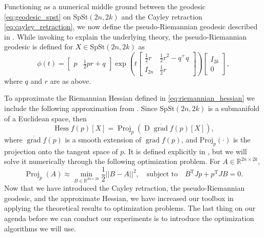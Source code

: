 Functioning as a numerical middle ground between the geodesic \eqref{eq:geodesic_spst} on $\mathrm{SpSt}(2n, 2k)$ and the Cayley retraction \eqref{eq:cayley_retraction}, we now define the pseudo-Riemannian geodesic described in \cite[p.~10]{BendokatZimmermann2021}. While invoking \cite{BendokatZimmermann2021} to explain the underlying theory, the pseudo-Riemannian geodesic is defined for $X\in \mathrm{SpSt}(2n, 2k)$ as 
%
\begin{equation*}
\phi(t)=\begin{bmatrix}
p & \frac{1}{2}pr+q
\end{bmatrix}\exp\left( t\begin{bmatrix}
\frac{1}{2}r  & \frac{1}{2}r^{2}-q^{+}q \\
I_{2n} & \frac{1}{2}r
\end{bmatrix} \right)
\begin{bmatrix}
I_{2k} \\
0
\end{bmatrix},
\end{equation*}
%
where $q$ and $r$ are as above. 

To approximate the Riemannian Hessian defined in \eqref{eq:riemannian_hessian} we include the following approximation from \cite[Corr.~5.16]{Boumal2023}. Since $\mathrm{SpSt}(2n, 2k)$ is a submanifold of a Euclidean space, then
%
\begin{equation*}
\operatorname{Hess}f(p)[X]=\operatorname{Proj}_{p}(\operatorname{D}\overline{\operatorname{grad}}f(p)[X]),
\end{equation*}
%
where $\overline{\operatorname{grad}}f(p)$ is a smooth extension of $\operatorname{grad}f(p)$, and $\mathrm{Proj}_{p}(\cdot)$ is the projection onto the tangent space of $p$. It is defined explicitly in \cite[Lemma~2.3]{JensenZimmermann2024}, but we will solve it numerically through the following optimization problem. For $A\in \mathbb{R}^{2n\times 2k}$,
%
\begin{equation*}
\operatorname{Proj}_{p}(A)\approx \operatorname*{min}_{B\in \mathbb{R}^{2n\times2k}} \frac{1}{2}\lvert \lvert B-A \rvert  \rvert ^{2},\quad\text{subject to}\quad B^{\mathrm{T}}Jp+p^{\mathrm{T}}JB=0.
\end{equation*}
%
Now that we have introduced the Cayley retraction, the pseudo-Riemannian geodesic, and the approximate Hessian, we have increased our toolbox in applying the theoretical results to optimization problems. The last thing on our agenda before we can conduct our experiments is to introduce the optimization algorithms we will use. 